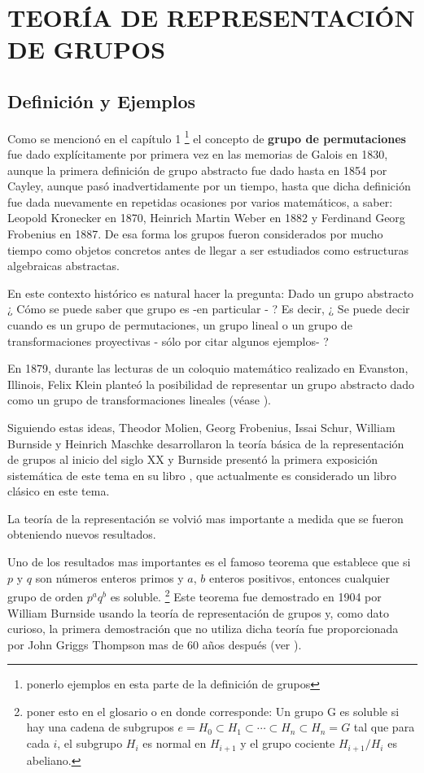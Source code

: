 \chapter{TEORÍA DE REPRESENTACIÓN DE GRUPOS}

\section{Definición y Ejemplos}

Como se mencionó en el capítulo 1 \footnote{ponerlo ejemplos en esta parte de la definición de grupos} el concepto de \textbf{grupo de permutaciones} fue dado explícitamente por primera vez en las memorias de Galois en  1830, aunque la primera definición de grupo abstracto fue dado hasta en 1854 por Cayley, aunque pasó inadvertidamente por un tiempo, hasta que dicha definición fue dada nuevamente en repetidas ocasiones por varios matemáticos, a saber: Leopold Kronecker en 1870, Heinrich Martin Weber en 1882 y Ferdinand Georg Frobenius en 1887. De esa forma los grupos fueron considerados por mucho tiempo como objetos concretos antes de llegar a ser estudiados como estructuras algebraicas abstractas.

En este contexto histórico es natural hacer la pregunta: Dado un grupo abstracto ¿ Cómo se puede saber que grupo es -en  particular - ? Es decir, ¿ Se puede decir cuando es un grupo de permutaciones, un grupo lineal o un grupo de transformaciones proyectivas  - sólo por citar algunos ejemplos- ?

En 1879, durante las lecturas de un coloquio matemático realizado en Evanston, Illinois, Felix Klein planteó la posibilidad de representar un grupo abstracto dado como un grupo de transformaciones lineales (véase \cite{bib:historia}).

Siguiendo estas ideas, Theodor Molien, Georg Frobenius, Issai Schur, William Burnside y  Heinrich Maschke desarrollaron la teoría básica de la representación de grupos al inicio del siglo XX y Burnside presentó la primera exposición  sistemática de este tema en su libro \cite{bib:burnside}, que actualmente es considerado un libro clásico en este tema. 

La teoría de la representación se volvió mas importante a medida que se fueron obteniendo nuevos resultados.

Uno de los resultados mas importantes es el famoso teorema que establece que si $p$ y $q$ son números enteros primos y  $a$, $b$ enteros positivos, entonces cualquier grupo de orden $p^aq^b$ es soluble. \footnote{poner esto en el glosario o en donde corresponde: Un grupo G es soluble si hay una cadena de subgrupos ${e} = H_0 \subset H_1 \subset \cdots \subset H_n \subset H_n = G$ tal que para cada $i$, el subgrupo $H_i$ es normal en $H_{i+1}$ y el grupo cociente $H_{i+1}/H_i$ es abeliano.} Este teorema fue demostrado en 1904 por William Burnside usando la teoría de representación de grupos y, como dato curioso, la primera demostración que no utiliza dicha teoría fue proporcionada por John Griggs Thompson mas de 60 años después (ver \cite{bib:grupsfact}).

